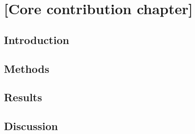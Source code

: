 \chapter{[Core contribution chapter]}
\label{chap:contribution-2}

\section{Introduction}

\section{Methods}

\section{Results}

\section{Discussion}
